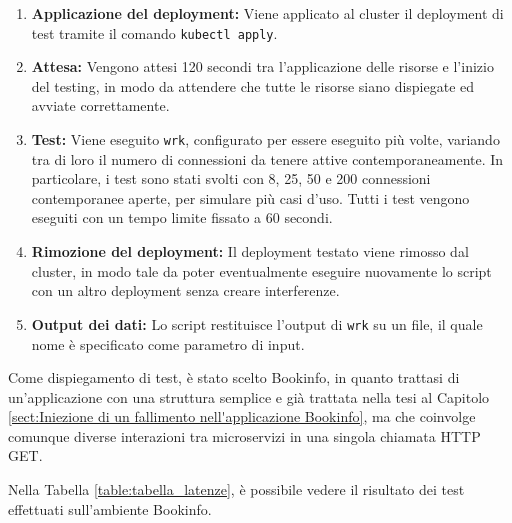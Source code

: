 \begin{enumerate}
    \item \textbf{Applicazione del deployment:} Viene applicato al cluster il deployment di test tramite il comando \texttt{kubectl apply}.
    \item \textbf{Attesa:} Vengono attesi 120 secondi tra l'applicazione delle risorse e l'inizio del testing, in modo da attendere che tutte le risorse siano dispiegate ed avviate correttamente.
    \item \textbf{Test:} Viene eseguito \texttt{wrk}, configurato per essere eseguito più volte, variando tra di loro il numero di connessioni da tenere attive contemporaneamente. In particolare, i test sono stati svolti con 8, 25, 50 e 200 connessioni contemporanee aperte, per simulare più casi d'uso. Tutti i test vengono eseguiti con un tempo limite fissato a 60 secondi.
    \item \textbf{Rimozione del deployment:} Il deployment testato viene rimosso dal cluster, in modo tale da poter eventualmente eseguire nuovamente lo script con un altro deployment senza creare interferenze.
    \item \textbf{Output dei dati:} Lo script restituisce l'output di \texttt{wrk} su un file, il quale nome è specificato come parametro di input.
\end{enumerate}
Come dispiegamento di test, è stato scelto Bookinfo, in quanto trattasi di un'applicazione con una struttura semplice e già trattata nella tesi al Capitolo \ref{sect:Iniezione di un fallimento nell'applicazione Bookinfo}, ma che coinvolge comunque diverse interazioni tra microservizi in una singola chiamata HTTP GET.

Nella Tabella \ref{table:tabella_latenze}, è possibile vedere il risultato dei test effettuati sull'ambiente Bookinfo.


